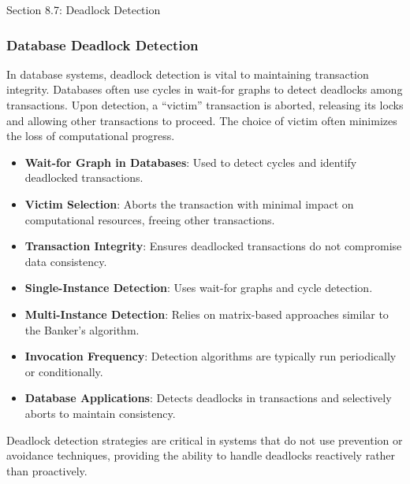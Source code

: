 \begin{notes}{Section 8.7: Deadlock Detection}
\begin{highlight}
    \end{highlight}
    
    \subsubsection*{Database Deadlock Detection}
    
    In database systems, deadlock detection is vital to maintaining transaction integrity. Databases often use cycles in wait-for graphs to detect deadlocks among transactions. Upon detection, a 
    “victim” transaction is aborted, releasing its locks and allowing other transactions to proceed. The choice of victim often minimizes the loss of computational progress.
    
    \begin{highlight}
    
        \begin{itemize}
            \item \textbf{Wait-for Graph in Databases}: Used to detect cycles and identify deadlocked transactions.
            \item \textbf{Victim Selection}: Aborts the transaction with minimal impact on computational resources, freeing other transactions.
            \item \textbf{Transaction Integrity}: Ensures deadlocked transactions do not compromise data consistency.
        \end{itemize}
    
    \end{highlight}
    
    \begin{highlight}
    
        \begin{itemize}
            \item \textbf{Single-Instance Detection}: Uses wait-for graphs and cycle detection.
            \item \textbf{Multi-Instance Detection}: Relies on matrix-based approaches similar to the Banker's algorithm.
            \item \textbf{Invocation Frequency}: Detection algorithms are typically run periodically or conditionally.
            \item \textbf{Database Applications}: Detects deadlocks in transactions and selectively aborts to maintain consistency.
        \end{itemize}
    
    Deadlock detection strategies are critical in systems that do not use prevention or avoidance techniques, providing the ability to handle deadlocks reactively rather than proactively.
    
    \end{highlight}
\end{notes}

